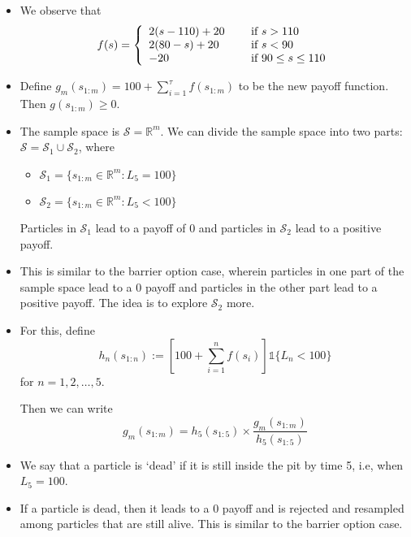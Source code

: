 \documentclass{article}
\begin{document}
\begin{itemize}

\item We observe that
\[f(s) = \left\{ 
  \begin{array}{l l}
    2(s-110) + 20 & \quad \text{ if } s > 110 \\
   2(80-s) + 20 & \quad \text{ if } s < 90 \\
   -20 & \quad \text{ if } 90 \leq s \leq 110
  \end{array} \right.\]

\item Define $ g_{m}(s_{1:m}) = 100 + \sum_{i=1}^{\tau} f ( s_{1:m} ) $ to be the new payoff function. Then $g(s_{1:m}) \geq 0$. 

\item The sample space is $\mathcal{S} = \mathbb{R}^{m}$. We can divide the sample space into two parts: $ \mathcal{S} = \mathcal{S}_{1} \cup \mathcal{S}_{2}$, where 
\begin{itemize} 
\item[] $ \mathcal{S}_{1} = \{ s_{1:m} \in \mathbb{R}^{m}: L_{5} = 100 \}$
\item[] $ \mathcal{S}_{2} = \{ s_{1:m} \in \mathbb{R}^{m}: L_{5} < 100 \}$
\end{itemize}
Particles in $\mathcal{S}_{1}$ lead to a payoff of 0 and particles in $\mathcal{S}_{2}$ lead to a positive payoff.  

\item This is similar to the barrier option case, wherein particles in one part of the sample space lead to a 0 payoff and particles in the other part lead to a positive payoff. The idea is to explore $\mathcal{S}_{2}$ more. 

\item For this, define 
$$h_{n}(s_{1:n}) := \left [ 100 + \sum_{i=1}^{n} f(s_{i}) \right ] \mathds{1} \{ L_{n} < 100 \}$$ 
for $n = 1, 2, \ldots, 5$.

Then we can write 
$$ g_{m}(s_{1:m}) = h_{5}(s_{1:5}) \times \frac{ g_{m}(s_{1:m}) } { h_{5} (s_{1:5}) } $$  

\item We say that a particle is `dead' if it is still inside the pit by time 5, i.e, when $L_{5} = 100$.

\item If a particle is dead, then it leads to a 0 payoff and is rejected and resampled among particles that are still alive. This is similar to the barrier option case.

\end{itemize}
\end{document}
